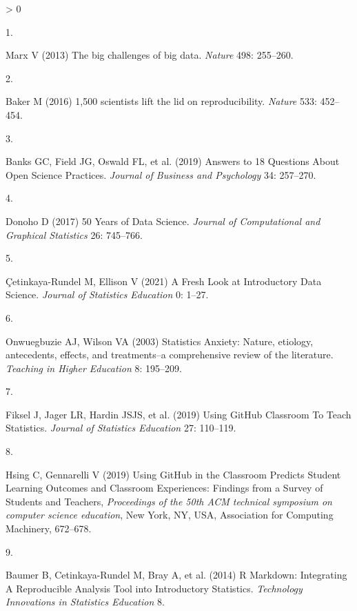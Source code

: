 \documentclass{aims}
\theoremstyle{definition}
\newlength{\cslhangindent}
\newlength{\csllabelwidth}
\newenvironment{CSLReferences}[3] %
   {%
    \setlength{\parindent}{0pt}
    \ifodd #1 \everypar{\setlength{\hangindent}{\cslhangindent}}\ignorespaces\fi
    \ifnum #2 > 0
    \setlength{\parskip}{#2\baselineskip}
    \fi
   }%
   {}
\newcommand{\CSLLeftMargin}[1]{\parbox[t]{\maxof{\widthof{#1}}{\csllabelwidth}}{#1}}
\newcommand{\CSLRightInline}[1]{\parbox[t]{\linewidth}{#1}}
\begin{document}
\hypertarget{refs}{}
\begin{CSLReferences}{0}{0}
\leavevmode\hypertarget{ref-Marx2013}{}%
\CSLLeftMargin{1. }
\CSLRightInline{Marx V (2013) {The big challenges of big data}.
\emph{Nature} 498: 255--260.}

\leavevmode\hypertarget{ref-Baker2016}{}%
\CSLLeftMargin{2. }
\CSLRightInline{Baker M (2016) 1,500 scientists lift the lid on
reproducibility. \emph{Nature} 533: 452--454.}

\leavevmode\hypertarget{ref-Banks2019}{}%
\CSLLeftMargin{3. }
\CSLRightInline{Banks GC, Field JG, Oswald FL, et al. (2019) {Answers to
18 Questions About Open Science Practices}. \emph{Journal of Business
and Psychology} 34: 257--270.}

\leavevmode\hypertarget{ref-Donoho2017}{}%
\CSLLeftMargin{4. }
\CSLRightInline{Donoho D (2017) {50 Years of Data Science}.
\emph{Journal of Computational and Graphical Statistics} 26: 745--766.}

\leavevmode\hypertarget{ref-Cetinkaya-Rundel2021}{}%
\CSLLeftMargin{5. }
\CSLRightInline{Çetinkaya-Rundel M, Ellison V (2021) {A Fresh Look at
Introductory Data Science}. \emph{Journal of Statistics Education} 0:
1--27.}

\leavevmode\hypertarget{ref-Onwuegbuzie2003}{}%
\CSLLeftMargin{6. }
\CSLRightInline{Onwuegbuzie AJ, Wilson VA (2003) {Statistics Anxiety:
Nature, etiology, antecedents, effects, and treatments--a comprehensive
review of the literature}. \emph{Teaching in Higher Education} 8:
195--209.}

\leavevmode\hypertarget{ref-Fiksel2019}{}%
\CSLLeftMargin{7. }
\CSLRightInline{Fiksel J, Jager LR, Hardin JSJS, et al. (2019) {Using
GitHub Classroom To Teach Statistics}. \emph{Journal of Statistics
Education} 27: 110--119.}

\leavevmode\hypertarget{ref-Hsing2019}{}%
\CSLLeftMargin{8. }
\CSLRightInline{Hsing C, Gennarelli V (2019) {Using GitHub in the
Classroom Predicts Student Learning Outcomes and Classroom Experiences:
Findings from a Survey of Students and Teachers}, \emph{Proceedings of
the 50th ACM technical symposium on computer science education}, New
York, NY, USA, Association for Computing Machinery, 672--678.}

\leavevmode\hypertarget{ref-Baumer2014}{}%
\CSLLeftMargin{9. }
\CSLRightInline{Baumer B, Cetinkaya-Rundel M, Bray A, et al. (2014) {R
Markdown: Integrating A Reproducible Analysis Tool into Introductory
Statistics}. \emph{Technology Innovations in Statistics Education} 8.}


\end{CSLReferences}
\end{document}

